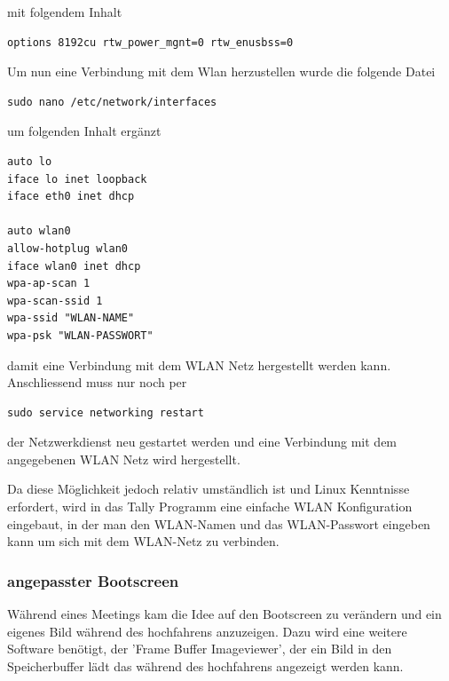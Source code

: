 \documentclass[11pt,a4paper]{article} %
\begin{document}
mit folgendem Inhalt
\begin{frame}

\begin{lstlisting}
options 8192cu rtw_power_mgnt=0 rtw_enusbss=0
\end{lstlisting}

\end{frame}
\par
\par
Um nun eine Verbindung mit dem Wlan herzustellen wurde die folgende Datei
\begin{frame}

\begin{lstlisting}
sudo nano /etc/network/interfaces
\end{lstlisting}

\end{frame}

um folgenden Inhalt ergänzt
\begin{frame}

\begin{lstlisting}
auto lo
iface lo inet loopback
iface eth0 inet dhcp

auto wlan0
allow-hotplug wlan0
iface wlan0 inet dhcp
wpa-ap-scan 1
wpa-scan-ssid 1
wpa-ssid "WLAN-NAME"
wpa-psk "WLAN-PASSWORT"

\end{lstlisting}

\end{frame}

damit eine Verbindung mit dem WLAN Netz hergestellt werden kann.
Anschliessend muss nur noch per
\begin{frame}

\begin{lstlisting}
sudo service networking restart
\end{lstlisting}

\end{frame}
der Netzwerkdienst neu gestartet werden und eine Verbindung mit dem angegebenen WLAN Netz wird hergestellt.
\par
Da diese Möglichkeit jedoch relativ umständlich ist und Linux Kenntnisse erfordert, wird in das Tally Programm eine einfache WLAN Konfiguration eingebaut, in der man den WLAN-Namen und das WLAN-Passwort eingeben kann um sich mit dem WLAN-Netz zu verbinden.

\subsubsection{angepasster Bootscreen}
Während eines Meetings kam die Idee auf den Bootscreen zu verändern und ein eigenes Bild während des hochfahrens anzuzeigen. Dazu wird eine weitere Software benötigt, der 'Frame Buffer Imageviewer', der ein Bild in den Speicherbuffer lädt das während des hochfahrens angezeigt werden kann. \cite{7}
\end{document}
